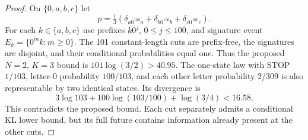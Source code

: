 \begin{proof}
On $\{0,a,b,c\}$ let
\[
 p=\tfrac13(\delta_{a0^{100}a}+\delta_{b0^{100}b}+\delta_{c0^{100}c}).
\]
For each $k\in\{a,b,c\}$ use prefixes $k0^j$, $0\le j\le100$,
and signature event $E_k=\{0^mk:m\ge0\}$. The 101 constant-length
cuts are prefix-free, the signatures are disjoint, and their
conditional probabilities equal one. Thus the proposed $N=2$, $K=3$
bound is $101\log(3/2)>40.95$. The one-state law with STOP $1/103$,
letter-$0$ probability $100/103$, and each other letter probability
$2/309$ is also representable by two identical states. Its divergence is
\[
 3\log103+100\log(103/100)+\log(3/4)<16.58.
\]
This contradicts the proposed bound. Each cut separately admits a
conditional KL lower bound, but its full future contains information
already present at the other cuts.
\end{proof}
